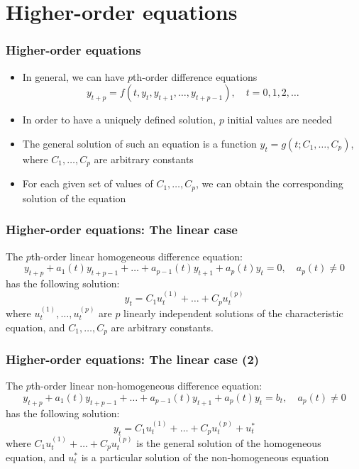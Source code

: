 \documentclass[10pt,usenames,dvipsnames]{beamer}
\theoremstyle{definition}
\begin{document}
\section{Higher-order equations}
\begin{frame}[fragile]
\frametitle{Higher-order equations}
\begin{itemize}
	\item In general, we can have $p$th-order difference equations
	\[
		y_{t+p} = f(t, y_{t}, y_{t+1}, \ldots, y_{t+p-1}), \quad t = 0, 1, 2, \ldots
	\]
	\item In order to have a uniquely defined solution, $p$ initial values are needed
	\item The general solution of such an equation is a function $y_{t} = g(t;C_{1},\ldots, C_{p})$, where $C_{1}, \ldots, C_{p}$ are arbitrary constants
	\item For each given set of values of $C_{1}, \ldots, C_{p}$, we can obtain the corresponding solution of the equation
\end{itemize}
\end{frame}

\begin{frame}[fragile]
\frametitle{Higher-order equations: The linear case}
\begin{theorem}
	The  $p$th-order linear homogeneous difference equation:
	\[
		y_{t+p} + a_{1}(t)y_{t+p-1} + \ldots + a_{p-1}(t)y_{t+1} + a_{p}(t)y_{t} = 0, \quad a_{p}(t) \neq 0
	\]
	has the following solution:
	\[
		y_{t} = C_{1}u_{t}^{(1)} + \ldots + C_{p}u_{t}^{(p)}
	\]
	where $u_{t}^{(1)}, \ldots, u_{t}^{(p)}$ are $p$ linearly independent solutions of the characteristic equation, and $C_{1}, \ldots, C_{p}$ are arbitrary constants.
\end{theorem}
\end{frame}

\begin{frame}[fragile]
\frametitle{Higher-order equations: The linear case (2)}
\begin{theorem}
	The  $p$th-order linear non-homogeneous difference equation:
	\[
		y_{t+p} + a_{1}(t)y_{t+p-1} + \ldots + a_{p-1}(t)y_{t+1} + a_{p}(t)y_{t} = b_{t}, \quad a_{p}(t) \neq 0
	\]
	has the following solution:
	\[
		y_{t} = C_{1}u_{t}^{(1)} + \ldots + C_{p}u_{t}^{(p)} + u_{t}^{*}
	\]
	where $C_{1}u_{t}^{(1)} + \ldots + C_{p}u_{t}^{(p)}$ is the general solution of the homogeneous equation, and $u_{t}^{*}$ is a particular solution of the non-homogeneous equation
\end{theorem}
\end{frame}
\end{document}
